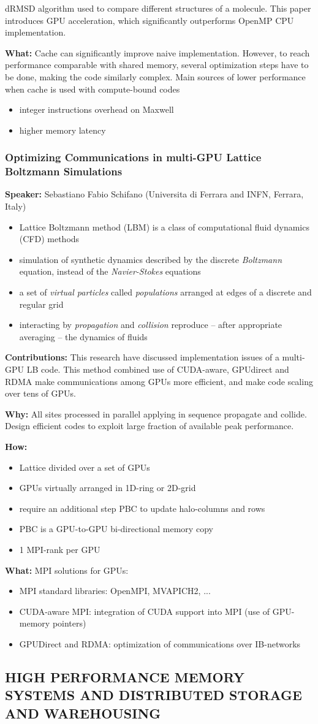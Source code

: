 \documentclass[twocolumn]{article}
\newcommand{\bi}{\begin{itemize}}
\newcommand{\ei}{\end{itemize}}
\newcommand{\ii}{\item}
\begin{document}
dRMSD algorithm used to compare different structures of a molecule. 
This paper introduces GPU acceleration, which significantly outperforms OpenMP CPU implementation.

\noindent
\textbf{What:}  
Cache can significantly improve naive implementation.
However, to reach performance comparable with shared memory, several optimization steps have to be done, making the code similarly complex.
Main sources of lower performance when cache is used with compute-bound codes
\bi
\ii integer instructions overhead on Maxwell 
\ii higher memory latency
\ei

\subsubsection{Optimizing Communications in multi-GPU Lattice Boltzmann Simulations}
\textbf{Speaker:} Sebastiano Fabio Schifano (Universita di Ferrara and INFN, Ferrara, Italy)
\bi
\ii Lattice Boltzmann method (LBM) is a class of computational fluid dynamics (CFD) methods
\ii  simulation of synthetic dynamics described by the discrete \textit{Boltzmann} equation, instead of the \textit{Navier-Stokes} equations
\ii a set of \textit{virtual particles} called \textit{populations} arranged at edges of a discrete and regular grid
\ii  interacting by \textit{propagation} and \textit{collision} reproduce – after appropriate averaging – the dynamics of fluids
\ei
\noindent
\textbf{Contributions:}  
This research have discussed implementation issues of a multi-GPU LB code. This method combined use of CUDA-aware, GPUdirect and RDMA make communications among GPUs more efficient, and make code scaling over tens of GPUs.

\noindent
\textbf{Why:}  All sites processed in parallel applying in sequence propagate and collide.
Design efficient codes to exploit large fraction of available peak performance.

\noindent
\textbf{How:}  
\bi
\ii Lattice divided over a set of GPUs
\ii GPUs virtually arranged in 1D-ring or 2D-grid
\ii require an additional step PBC to update halo-columns and rows
\ii  PBC is a GPU-to-GPU bi-directional memory copy
\ii 1 MPI-rank per GPU
\ei

\noindent
\textbf{What:}  
MPI solutions for GPUs:
\bi
\ii MPI standard libraries: OpenMPI, MVAPICH2, ...
\ii CUDA-aware MPI: integration of CUDA support into MPI (use of GPU-memory pointers)
\ii GPUDirect and RDMA: optimization of communications over IB-networks
\ei

\subsection{HIGH PERFORMANCE MEMORY SYSTEMS AND DISTRIBUTED STORAGE AND WAREHOUSING}
\end{document}

